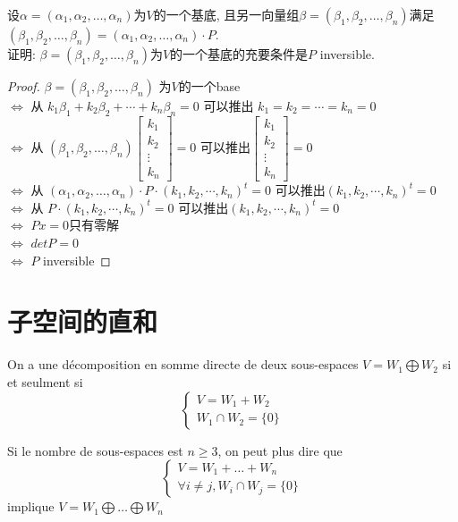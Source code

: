 \documentclass{book}
\begin{document}
\begin{question}
设$\alpha = (\alpha_1, \alpha_2, \ldots, \alpha_n)$为$V$的一个基底, 且另一向量组$\beta = (\beta_1, \beta_2, \ldots, \beta_n)$满足
$(\beta_1, \beta_2, \ldots, \beta_n) = (\alpha_1, \alpha_2, \ldots, \alpha_n) \cdot P$.\\
证明: $\beta = (\beta_1, \beta_2, \ldots, \beta_n)$为$V$的一个基底的充要条件是$P$ inversible.
\end{question}
\begin{proof}
$\beta = (\beta_1, \beta_2, \ldots, \beta_n)$ 为$V$的一个base \\
$\Leftrightarrow$ 从 $k_1 \beta_1 + k_2 \beta_2 + \cdots + k_n \beta_n = 0$ 可以推出 $k_1 = k_2 = \cdots = k_n = 0$ \\
$\Leftrightarrow$ 从 $(\beta_1, \beta_2, \ldots, \beta_n) \begin{bmatrix}k_1 \\ k_2 \\ \vdots \\ k_n\end{bmatrix} = 0$
	可以推出$\begin{bmatrix}k_1 \\ k_2 \\ \vdots \\ k_n\end{bmatrix} = 0$ \\
$\Leftrightarrow$ 从 $(\alpha_1, \alpha_2, \ldots, \alpha_n) \cdot P \cdot (k_1, k_2, \cdots, k_n)^t = 0$ 可以推出$(k_1, k_2, \cdots, k_n)^t = 0$ \\
$\Leftrightarrow$ 从 $P \cdot (k_1, k_2, \cdots, k_n)^t = 0$ 可以推出$(k_1, k_2, \cdots, k_n)^t = 0$  \\
$\Leftrightarrow$ $Px = 0$只有零解 \\
$\Leftrightarrow$ $detP = 0$ \\
$\Leftrightarrow$ $P$ inversible
\end{proof}

\section{子空间的直和}
\begin{theorem}
  On a une d\'ecomposition en somme directe de deux sous-espaces $ V = W_1 \bigoplus W_2$  si et seulment si
  $$
    \begin{cases}
    V=W_1+W_2 \\
    W_1\cap W_2=\{0\}
    \end{cases}
  $$
\end{theorem}
\begin{attention}
  Si le nombre de sous-espaces est $n\geqslant 3$, on peut plus dire que
  $$
    \begin{cases}
    V=W_1+\dots+W_n \\
    \forall i \neq j,W_i\cap W_j=\{0\}
    \end{cases}
  $$
  implique $ V = W_1 \bigoplus \dots \bigoplus W_n$
\end{attention}
\end{document}
